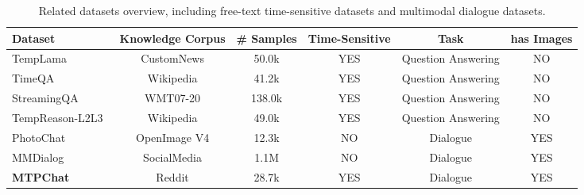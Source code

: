 \begin{table*}[ht]
\centering
\resizebox{0.95\linewidth}{!}
{
\begin{tabular}{l|ccccc}
\toprule
\textbf{Dataset} & \textbf{Knowledge Corpus} & \textbf{\# Samples} & \textbf{Time-Sensitive} & \textbf{Task} & \textbf{has Images}\\
\midrule
TempLama~\cite{dhingra2022time} & CustomNews & 50.0k & YES & Question Answering & NO\\
TimeQA~\cite{chen2021dataset} & Wikipedia & 41.2k & YES & Question Answering & NO\\
StreamingQA~\cite{liska2022streamingqa} & WMT07-20 & 138.0k & YES & Question Answering & NO\\
TempReason-L2L3~\cite{tan2023towards} & Wikipedia & 49.0k & YES & Question Answering & NO\\

\midrule
PhotoChat~\cite{zang2021photochat} & OpenImage V4& 12.3k & NO & Dialogue & YES \\
MMDialog~\cite{feng2022mmdialog} & SocialMedia& 1.1M & NO & Dialogue & YES\\
\midrule
\textbf{MTPChat} &Reddit & 28.7k & YES & Dialogue & YES \\
\bottomrule
\end{tabular}
}
\vspace{-2mm}
\caption{\label{comparison}
Related datasets overview, including free-text time-sensitive datasets and multimodal dialogue datasets.}
\vspace{-4mm}
\end{table*}


